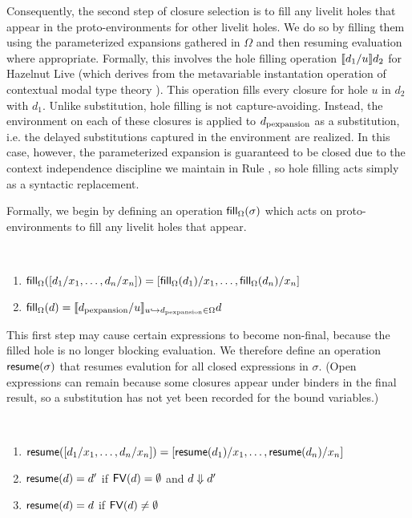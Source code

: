 Consequently, the second step of closure selection is to fill any livelit holes that appear in the proto-environments for other livelit holes.
We do so by filling them using the parameterized expansions gathered in $\Omega$ and then resuming
evaluation where appropriate.
Formally, this involves the hole filling operation $\llbracket d_1 / u\rrbracket d_2$ for Hazelnut Live
(which derives from the metavariable instantation operation of contextual modal type theory \cite{HazelnutLive,Nanevski2008}).
This operation 
fills every closure for hole $u$ in $d_2$ with $d_1$. 
Unlike substitution, hole filling is
not capture-avoiding. Instead, the environment on each of these closures is applied to $d_\text{pexpansion}$
as a substitution, i.e. the delayed substitutions captured in the environment are realized.
In this case, however, the parameterized expansion is guaranteed to be closed due to 
the context independence discipline we maintain in Rule , 
so hole filling acts simply as a syntactic replacement.

Formally, we begin by defining an operation $\mathsf{fill}_{\Omega}(\sigma)$ which acts on proto-environments 
to fill any livelit holes that appear.
\begin{definition} ~
    \begin{enumerate}
        \item $\mathsf{fill}_{\Omega}([d_1/x_1, \ldots, d_n/x_n]) = [\mathsf{fill}_{\Omega}(d_1)/x_1, \ldots, \mathsf{fill}_{\Omega}(d_n)/x_n]$
        \item $\mathsf{fill}_{\Omega}(d) = \llbracket d_\text{pexpansion} / u\rrbracket_{u \hookrightarrow d_\text{pexpansion} \in \Omega}{d}$
    \end{enumerate}
\end{definition}

This first step may cause certain expressions to become non-final, because the filled hole is no longer
blocking evaluation. We therefore define an operation $\mathsf{resume}(\sigma)$ that resumes evalution for all closed expressions in $\sigma$.
(Open expressions can remain because some closures appear under binders in the final result, so a substitution has not yet been recorded
for the bound variables.)
\begin{definition} ~
    \begin{enumerate}
        \item $\mathsf{resume}([d_1/x_1, \ldots, d_n/x_n]) = [\mathsf{resume}(d_1)/x_1, \ldots, \mathsf{resume}(d_n)/x_n]$
        \item $\mathsf{resume}(d) = d'$ if $\mathsf{FV}(d) = \emptyset$ and $d \Downarrow d'$
        \item $\mathsf{resume}(d) = d$ if $\mathsf{FV}(d) \neq \emptyset$
    \end{enumerate}
\end{definition}

